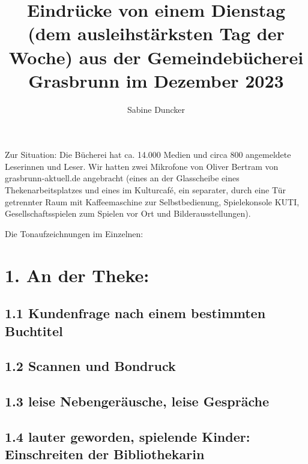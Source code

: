 \documentclass[a4paper,
fontsize=11pt,
oneside,
numbers=noperiodatend,
parskip=half-,
bibliography=totoc,
final
]{scrartcl}
\title{\LARGE{Eindrücke von einem Dienstag (dem ausleihstärksten Tag der Woche) aus der Gemeindebücherei Grasbrunn im Dezember 2023}}%
\author{Sabine Duncker} %
\date{}
\begin{document}
\maketitle
\thispagestyle{fancyplain} 


Zur Situation: Die Bücherei hat ca. 14.000 Medien und circa 800
angemeldete Leserinnen und Leser. Wir hatten zwei Mikrofone von Oliver
Bertram von grasbrunn-aktuell.de angebracht (eines an der Glasscheibe
eines Thekenarbeitsplatzes und eines im Kulturcafé, ein separater, durch
eine Tür getrennter Raum mit Kaffeemaschine zur Selbstbedienung,
Spielekonsole KUTI, Gesellschaftsspielen zum Spielen vor Ort und
Bilderausstellungen).

Die Tonaufzeichnungen im Einzelnen:

\hypertarget{an-der-theke}{%
\section{1. An der Theke:}\label{an-der-theke}}

\hypertarget{kundenfrage-nach-einem-bestimmten-buchtitel}{%
\subsection{1.1 Kundenfrage nach einem bestimmten
Buchtitel}\label{kundenfrage-nach-einem-bestimmten-buchtitel}}

\hypertarget{scannen-und-bondruck}{%
\subsection{1.2 Scannen und Bondruck}\label{scannen-und-bondruck}}

\hypertarget{leise-nebengeruxe4usche-leise-gespruxe4che}{%
\subsection{1.3 leise Nebengeräusche, leise
Gespräche}\label{leise-nebengeruxe4usche-leise-gespruxe4che}}

\hypertarget{lauter-geworden-spielende-kinder-einschreiten-der-bibliothekarin}{%
\subsection{1.4 lauter geworden, spielende Kinder: Einschreiten der
Bibliothekarin}\label{lauter-geworden-spielende-kinder-einschreiten-der-bibliothekarin}}
\end{document}
